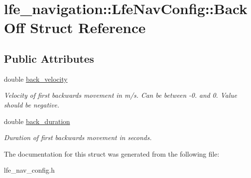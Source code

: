 \hypertarget{structlfe__navigation_1_1LfeNavConfig_1_1BackOff}{}\section{lfe\+\_\+navigation\+:\+:Lfe\+Nav\+Config\+:\+:Back\+Off Struct Reference}
\label{structlfe__navigation_1_1LfeNavConfig_1_1BackOff}
\subsection*{Public Attributes}
\begin{DoxyCompactItemize}
\item 
double \hyperlink{structlfe__navigation_1_1LfeNavConfig_1_1BackOff_a27714b20ff0467e32942cd10718d1688}{back\+\_\+velocity}\hypertarget{structlfe__navigation_1_1LfeNavConfig_1_1BackOff_a27714b20ff0467e32942cd10718d1688}{}\label{structlfe__navigation_1_1LfeNavConfig_1_1BackOff_a27714b20ff0467e32942cd10718d1688}

\begin{DoxyCompactList}\small\item\em Velocity of first backwards movement in m/s. Can be between -\/0. and 0. Value should be negative. \end{DoxyCompactList}\item 
double \hyperlink{structlfe__navigation_1_1LfeNavConfig_1_1BackOff_a84e57368d85b9e8eb9e4ab01a8cd97e7}{back\+\_\+duration}\hypertarget{structlfe__navigation_1_1LfeNavConfig_1_1BackOff_a84e57368d85b9e8eb9e4ab01a8cd97e7}{}\label{structlfe__navigation_1_1LfeNavConfig_1_1BackOff_a84e57368d85b9e8eb9e4ab01a8cd97e7}

\begin{DoxyCompactList}\small\item\em Duration of first backwards movement in seconds. \end{DoxyCompactList}\end{DoxyCompactItemize}


The documentation for this struct was generated from the following file\+:\begin{DoxyCompactItemize}
\item 
lfe\+\_\+nav\+\_\+config.\+h\end{DoxyCompactItemize}
